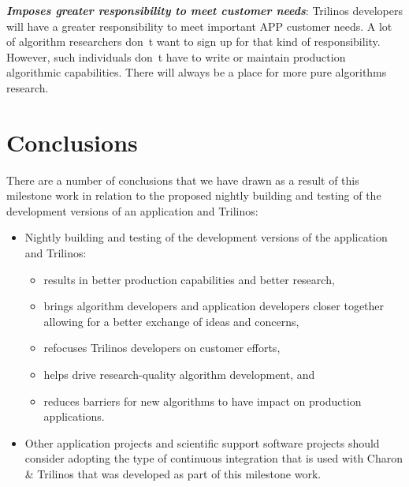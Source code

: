 \documentclass[pdf,ps2pdf,11pt]{SANDreport}
\begin{document}
{}\textit{\textbf{Imposes greater responsibility to meet customer needs}}:
Trilinos developers will have a greater responsibility to meet important APP
customer needs.  A lot of algorithm researchers don~t want to sign up for that
kind of responsibility.  However, such individuals don~t have to write or
maintain production algorithmic capabilities.  There will always be a place
for more pure algorithms research.


%
\section{Conclusions}
%

There are a number of conclusions that we have drawn as a result of this
milestone work in relation to the proposed nightly building and testing of the
development versions of an application and Trilinos:

\begin{itemize}

{}\item Nightly building and testing of the development versions of the
application and Trilinos:

  \begin{itemize}

  {}\item results in better production capabilities and better research,

  {}\item brings algorithm developers and application developers closer
  together allowing for a better exchange of ideas and concerns,

  {}\item refocuses Trilinos developers on customer efforts,

  {}\item helps drive research-quality algorithm development, and
        
  {}\item reduces barriers for new algorithms to have impact on production
  applications.

  \end{itemize}

{}\item Other application projects and scientific support software projects
should consider adopting the type of continuous integration that is used with
Charon \& Trilinos that was developed as part of this milestone work.

\end{itemize}

%
\clearpage



%
%

\end{document}
